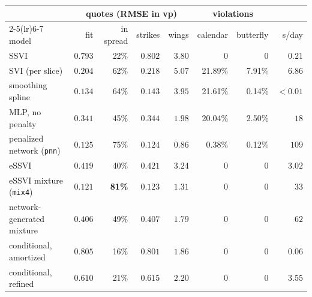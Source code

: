 \begin{tabular}{lrrrrrrr}
\toprule
& \multicolumn{4}{c}{quotes (RMSE in vp)} & \multicolumn{2}{c}{violations} & \\
\cmidrule(lr){2-5}\cmidrule(lr){6-7}
model & fit & in spread & strikes & wings & calendar & butterfly & s/day \\
\midrule
SSVI & $0.793$ & 22\% & $0.802$ & $3.80$ & 0 & 0 & $0.21$ \\
SVI (per slice) & $0.204$ & 62\% & $0.218$ & $5.07$ & 21.89\% & 7.91\% & $6.86$ \\
smoothing spline & $0.134$ & 64\% & $0.143$ & $3.95$ & 21.61\% & 0.14\% & $<0.01$ \\
MLP, no penalty & $0.341$ & 45\% & $0.344$ & $1.98$ & 20.04\% & 2.50\% & $18$ \\
penalized network (\texttt{pnn}) & $0.125$ & 75\% & $0.124$ & $\mathbf{0.86}$ & 0.38\% & 0.12\% & $109$ \\
eSSVI & $0.419$ & 40\% & $0.421$ & $3.24$ & 0 & 0 & $3.02$ \\
eSSVI mixture (\texttt{mix4}) & $\mathbf{0.121}$ & \textbf{81\%} & $\mathbf{0.123}$ & $1.31$ & 0 & 0 & $33$ \\
network-generated mixture & $0.406$ & 49\% & $0.407$ & $1.79$ & 0 & 0 & $62$ \\
conditional, amortized & $0.805$ & 16\% & $0.801$ & $1.86$ & 0 & 0 & $0.06$ \\
conditional, refined & $0.610$ & 21\% & $0.615$ & $2.20$ & 0 & 0 & $3.55$ \\
\bottomrule
\end{tabular}
